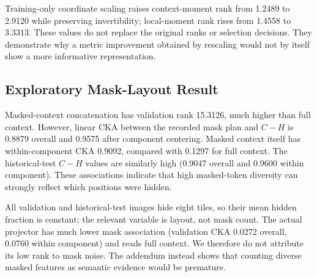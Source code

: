 Training-only coordinate scaling raises context-moment rank from 1.2489 to 2.9120 while preserving invertibility; local-moment rank rises from 1.4558 to 3.3313. These values do not replace the original ranks or selection decisions. They demonstrate why a metric improvement obtained by rescaling would not by itself show a more informative representation.

\subsection{Exploratory Mask-Layout Result}
Masked-context concatenation has validation rank 15.3126, much higher than full context. However, linear CKA between the recorded mask plan and $C-H$ is 0.8879 overall and 0.9575 after component centering. Masked context itself has within-component CKA 0.9092, compared with 0.1297 for full context. The historical-test $C-H$ values are similarly high (0.9047 overall and 0.9600 within component). These associations indicate that high masked-token diversity can strongly reflect which positions were hidden.

All validation and historical-test images hide eight tiles, so their mean hidden fraction is constant; the relevant variable is layout, not mask count. The actual projector has much lower mask association (validation CKA 0.0272 overall, 0.0760 within component) and reads full context. We therefore do not attribute its low rank to mask noise. The addendum instead shows that counting diverse masked features as semantic evidence would be premature.
